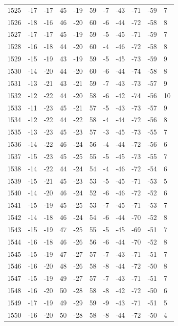 \begin{table}[H]
\begin{tabular}{lllllllllll}
1525 & -17 & -17 & 45 & -19 & 59 & -7 & -43 & -71 & -59 & 7 \\
1526 & -18 & -16 & 46 & -20 & 60 & -6 & -44 & -72 & -58 & 8 \\
1527 & -17 & -17 & 45 & -19 & 59 & -5 & -45 & -71 & -59 & 7 \\
1528 & -16 & -18 & 44 & -20 & 60 & -4 & -46 & -72 & -58 & 8 \\
1529 & -15 & -19 & 43 & -19 & 59 & -5 & -45 & -73 & -59 & 9 \\
1530 & -14 & -20 & 44 & -20 & 60 & -6 & -44 & -74 & -58 & 8 \\
1531 & -13 & -21 & 43 & -21 & 59 & -7 & -43 & -73 & -57 & 9 \\
1532 & -12 & -22 & 44 & -20 & 58 & -6 & -42 & -74 & -56 & 10 \\
1533 & -11 & -23 & 45 & -21 & 57 & -5 & -43 & -73 & -57 & 9 \\
1534 & -12 & -22 & 44 & -22 & 58 & -4 & -44 & -72 & -56 & 8 \\
1535 & -13 & -23 & 45 & -23 & 57 & -3 & -45 & -73 & -55 & 7 \\
1536 & -14 & -22 & 46 & -24 & 56 & -4 & -44 & -72 & -56 & 6 \\
1537 & -15 & -23 & 45 & -25 & 55 & -5 & -45 & -73 & -55 & 7 \\
1538 & -14 & -22 & 44 & -24 & 54 & -4 & -46 & -72 & -54 & 6 \\
1539 & -15 & -21 & 45 & -23 & 53 & -5 & -45 & -71 & -53 & 5 \\
1540 & -14 & -20 & 46 & -24 & 52 & -6 & -46 & -72 & -52 & 6 \\
1541 & -15 & -19 & 45 & -25 & 53 & -7 & -45 & -71 & -53 & 7 \\
1542 & -14 & -18 & 46 & -24 & 54 & -6 & -44 & -70 & -52 & 8 \\
1543 & -15 & -19 & 47 & -25 & 55 & -5 & -45 & -69 & -51 & 7 \\
1544 & -16 & -18 & 46 & -26 & 56 & -6 & -44 & -70 & -52 & 8 \\
1545 & -15 & -19 & 47 & -27 & 57 & -7 & -43 & -71 & -51 & 7 \\
1546 & -16 & -20 & 48 & -26 & 58 & -8 & -44 & -72 & -50 & 8 \\
1547 & -15 & -19 & 49 & -27 & 57 & -7 & -43 & -71 & -51 & 7 \\
1548 & -16 & -20 & 50 & -28 & 58 & -8 & -42 & -72 & -50 & 6 \\
1549 & -17 & -19 & 49 & -29 & 59 & -9 & -43 & -71 & -51 & 5 \\
1550 & -16 & -20 & 50 & -28 & 58 & -8 & -44 & -72 & -50 & 4 \\

\end{tabular}
\end{table}
